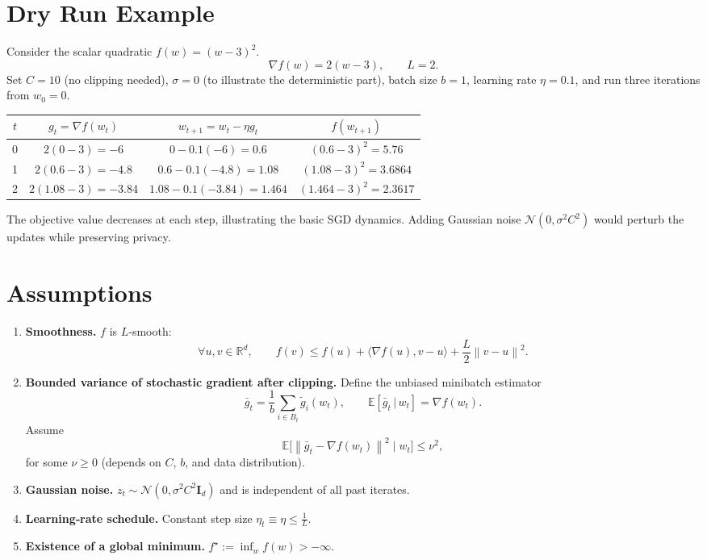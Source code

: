 \documentclass{article}
\newcommand{\E}{\mathbb{E}}
\newcommand{\R}{\mathbb{R}}
\newcommand{\norm}[1]{\left\|#1\right\|}
\newcommand{\grad}{\nabla}
\newcommand{\sig}{\sigma}
\begin{document}
\section*{Dry Run Example}
Consider the scalar quadratic $f(w)=(w-3)^2$.
\[
\grad f(w)=2(w-3),\qquad L=2.
\]
Set $C=10$ (no clipping needed), $\sig=0$ (to illustrate the deterministic part), batch size $b=1$, learning rate $\eta=0.1$, and run three iterations from $w_0=0$.

\begin{center}
\begin{tabular}{c|c|c|c}
$t$ & $g_t=\grad f(w_t)$ & $w_{t+1}=w_t-\eta g_t$ & $f(w_{t+1})$\\ \hline
0 & $2(0-3)=-6$ & $0-0.1(-6)=0.6$ & $(0.6-3)^2=5.76$\\
1 & $2(0.6-3)=-4.8$ & $0.6-0.1(-4.8)=1.08$ & $(1.08-3)^2=3.6864$\\
2 & $2(1.08-3)=-3.84$ & $1.08-0.1(-3.84)=1.464$ & $(1.464-3)^2=2.3617$\\
\end{tabular}
\end{center}
The objective value decreases at each step, illustrating the basic SGD dynamics. Adding Gaussian noise $\mathcal N(0,\sig^2 C^2)$ would perturb the updates while preserving privacy.

\newpage
\section*{Assumptions}
\begin{enumerate}
\item \textbf{Smoothness.} $f$ is $L$‑smooth:
\[
\forall u,v\in\R^d,\qquad 
f(v)\le f(u)+\langle\grad f(u),v-u\rangle+\frac{L}{2}\norm{v-u}^2.
\tag{A1}
\]

\item \textbf{Bounded variance of stochastic gradient after clipping.} Define the unbiased minibatch estimator
\[
\bar g_t=\frac{1}{b}\sum_{i\in B_t}\tilde g_i(w_t),\qquad 
\E[\bar g_t\,|\,w_t]=\grad f(w_t).
\]
Assume
\[
\E\bigl[\norm{\bar g_t-\grad f(w_t)}^2\mid w_t\bigr]\le \nu^2,
\tag{A2}
\]
for some $\nu\ge0$ (depends on $C$, $b$, and data distribution).

\item \textbf{Gaussian noise.} $z_t\sim\mathcal N(0,\sig^2 C^{2}\mathbf I_d)$ and is independent of all past iterates.

\item \textbf{Learning‑rate schedule.} Constant step size $\eta_t\equiv\eta\le \frac{1}{L}$.

\item \textbf{Existence of a global minimum.} $f^\star:=\inf_{w}f(w)>-\infty$.
\end{enumerate}
\end{document}
